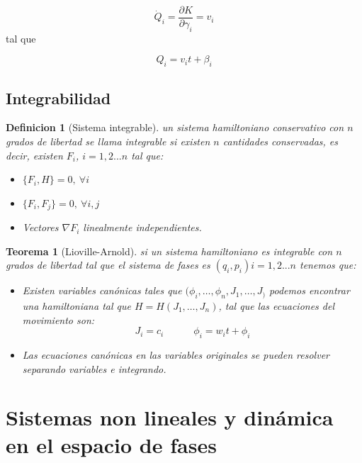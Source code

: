 \documentclass[12pt,a4paper]{article}
\numberwithin{equation}{section}
\numberwithin{figure}{section}
\newcommand{\parciales}[2]{\frac{\partial #1}{\partial #2}}
\newcommand{\tquad}{\quad \quad \quad}
\newtheorem{theorem}{Teorema}[section]
\newtheorem{definition}{Definicion}[section]
\begin{document}
\begin{equation}
\dot{Q}_i = \parciales{K}{\gamma_i} =v_i
\end{equation}
tal que

\begin{equation}
Q_i = v_i t + \beta_i 
\end{equation}


\subsection{Integrabilidad}

\begin{definition}[Sistema integrable]
un sistema hamiltoniano conservativo con $n$ grados de libertad se llama \textit{integrable} si existen $n$ cantidades conservadas, es decir, existen $F_i$, $i=1,2...n$ tal que:
\begin{itemize}
\item $\{ F_i , H \} = 0, \ \forall i$
\item $\{ F_i , F_j \} = 0, \ \forall i,j$
\item Vectores $\nabla F_i$ linealmente independientes.
\end{itemize}
\end{definition}
 
\begin{theorem}[Lioville-Arnold]
si un sistema hamiltoniano es integrable con $n$ grados de libertad tal que el sistema de fases es $(q_i,p_i) i = 1,2...n$ tenemos que:
\begin{itemize}
\item Existen variables canónicas tales que $(\phi_i,\ldots,\phi_n,J_1,\ldots,J_)$ podemos encontrar una hamiltoniana tal que $H=H(J_1,\ldots,J_n)$, tal que las ecuaciones del movimiento son:
\begin{equation}
J_i = c_i \tquad \phi_i = w_i t + \phi_i
\end{equation}
\item Las ecuaciones canónicas en las variables originales se pueden resolver separando variables e integrando.
\end{itemize}
\end{theorem}


\newpage

\section{Sistemas non lineales y dinámica en el espacio de fases}
\end{document}
